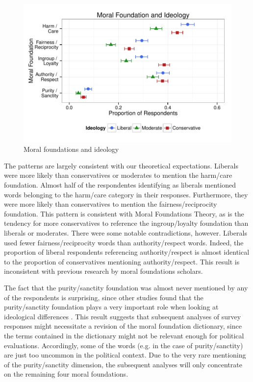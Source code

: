 \documentclass[12pt]{article}
\begin{document}
\begin{figure}[ht]\centering
\includegraphics{../calc/fig/fig1prop.pdf}
\caption{Moral foundations and ideology}\label{fig:1prop}
\end{figure}

The patterns are largely consistent with our theoretical expectations. Liberals were more likely than conservatives or moderates to mention the harm/care foundation. Almost half of the respondentes identifying as liberals mentioned words belonging to the harm/care category in their responses. Furthermore, they were more likely than conservatives to mention the fairness/reciprocity foundation. This pattern is consistent with Moral Foundations Theory, as is the tendency for more conservatives to reference the ingroup/loyalty foundation than liberals or moderates. There were some notable contradictions, however. Liberals used fewer fairness/reciprocity words than authority/respect words. Indeed, the proportion of liberal respondents referencing authority/respect is almost identical to the proportion of conservatives mentioning authority/respect. This result is inconsistent with previous research by moral foundations scholars.

The fact that the purity/sanctity foundation was almost never mentioned by any of the respondents is surprising, since other studies found that the purity/sanctity foundation plays a very important role when looking at ideological differences \citep{koleva2012tracing}. This result suggests that subsequent analyses of survey responses might necessitate a revision of the moral foundation dictionary, since the terms contained in the dictionary might not be relevant enough for political evaluations. Accordingly, some of the words (e.g. in the case of purity/sanctity) are just too uncommon in the political context. Due to the very rare mentioning of the purity/sanctity dimension, the subsequent analyses will only concentrate on the remaining four moral foundations.
\end{document}

